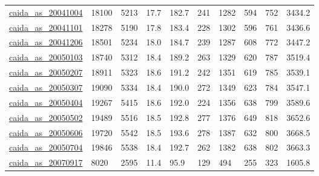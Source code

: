 \begin{longtable}{llllllllll}
 \href{http://snap.stanford.edu/data/as-caida.html}{caida\_as\_20041004}                                                      & 18100      & 5213  & 17.7   & 182.7  & 241   & 1282   & 594    & 752    & 3434.2  \\
 \href{http://snap.stanford.edu/data/as-caida.html}{caida\_as\_20041101}                                                      & 18278      & 5190  & 17.8   & 183.4  & 228   & 1302   & 596    & 761    & 3436.6  \\
 \href{http://snap.stanford.edu/data/as-caida.html}{caida\_as\_20041206}                                                      & 18501      & 5234  & 18.0   & 184.7  & 239   & 1287   & 608    & 772    & 3447.2  \\
 \href{http://snap.stanford.edu/data/as-caida.html}{caida\_as\_20050103}                                                      & 18740      & 5312  & 18.4   & 189.2  & 263   & 1329   & 620    & 787    & 3519.4  \\
 \href{http://snap.stanford.edu/data/as-caida.html}{caida\_as\_20050207}                                                      & 18911      & 5323  & 18.6   & 191.2  & 242   & 1351   & 619    & 785    & 3539.1  \\
 \href{http://snap.stanford.edu/data/as-caida.html}{caida\_as\_20050307}                                                      & 19090      & 5334  & 18.4   & 190.0  & 272   & 1349   & 623    & 784    & 3547.1  \\
 \href{http://snap.stanford.edu/data/as-caida.html}{caida\_as\_20050404}                                                      & 19267      & 5415  & 18.6   & 192.0  & 224   & 1356   & 638    & 799    & 3589.6  \\
 \href{http://snap.stanford.edu/data/as-caida.html}{caida\_as\_20050502}                                                      & 19489      & 5516  & 18.5   & 192.8  & 277   & 1376   & 649    & 818    & 3652.6  \\
 \href{http://snap.stanford.edu/data/as-caida.html}{caida\_as\_20050606}                                                      & 19720      & 5542  & 18.5   & 193.6  & 278   & 1387   & 632    & 800    & 3668.5  \\
 \href{http://snap.stanford.edu/data/as-caida.html}{caida\_as\_20050704}                                                      & 19846      & 5538  & 18.4   & 192.7  & 262   & 1382   & 638    & 802    & 3663.3  \\
 \href{http://snap.stanford.edu/data/as-caida.html}{caida\_as\_20070917}                                                      & 8020       & 2595  & 11.4   & 95.9   & 129   & 494    & 255    & 323    & 1605.8  \\

\end{longtable}
